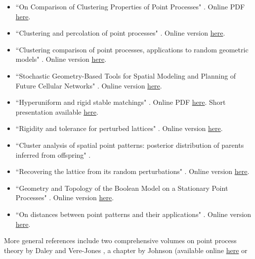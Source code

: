 \documentclass[10pt]{article}
\begin{document}
\begin{itemize}
\item ``On Comparison of Clustering Properties of Point Processes" \cite{bbvc}. Online PDF \href{https://arxiv.org/pdf/1111.6017.pdf}{here}.
\item ``Clustering and percolation of point processes" \cite{euclid}. Online version \href{https://projecteuclid.org/journals/electronic-journal-of-probability/volume-18/issue-none/Clustering-and-percolation-of-point-processes/10.1214/EJP.v18-2468.full}{here}.
\item ``Clustering comparison of point processes, applications to random geometric models" \cite{black}. Online version \href{https://arxiv.org/abs/1212.5285}{here}.
\item ``Stochastic Geometry-Based Tools for Spatial Modeling and Planning of Future Cellular Networks" \cite{poi102}. Online version \href{https://curve.carleton.ca/87495a55-a94a-4da3-a824-c075c80f6814}{here}.
\item ``Hyperuniform and rigid stable matchings" \cite{poi101}. Online PDF \href{https://arxiv.org/pdf/1810.00265.pdf}{here}.
Short presentation available \href{https://www.wias-berlin.de/workshops/SGC20/SGC20_Last.pdf}{here}.
\item ``Rigidity and tolerance for perturbed lattices" \cite{poi103}. Online version \href{https://arxiv.org/abs/1409.4490}{here}.
\item ``Cluster analysis of spatial point patterns: posterior distribution of parents inferred from offspring" \cite{scott}.
\item ``Recovering the lattice from its random perturbations" \cite{oren}. Online version \href{https://arxiv.org/abs/2002.01508v2}{here}.
\item ``Geometry and Topology of the Boolean Model on a Stationary Point Processes" \cite{yogd}. Online version \href{https://www.researchgate.net/publication/325215252_Geometry_and_Topology_of_the_Boolean_Model_on_a_Stationary_Point_Processes_A_Brief_Survey}{here}.
\item ``On distances between point patterns and their applications" \cite{diez2010}. Online version \href{https://www.researchgate.net/publication/228566956_On_distances_between_point_patterns_and_their_applications}{here}.
\end{itemize}
More general references include two comprehensive volumes on point process theory by Daley and Vere-Jones \cite{dddj1,dddj2}, a chapter by Johnson \cite{nisox} (available
 online \href{http://www.nisox.org/files/PDF/JohnsonSpatialPointProc.pdf}{here} or
\end{document}
